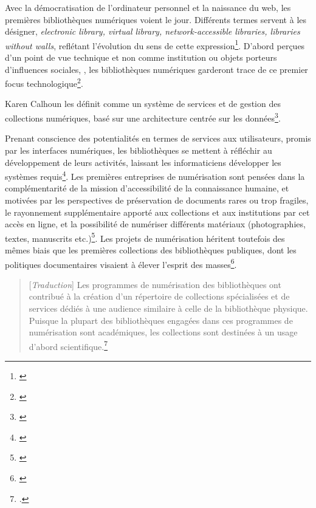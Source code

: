 Avec la démocratisation de l'ordinateur personnel et la naissance du web, les premières bibliothèques numériques voient le jour. Différents termes servent à les désigner, \textit{electronic library, virtual library, network-accessible libraries, libraries without walls}, reflétant l'évolution du sens de cette expression\footnote{\cite[p.3]{xie_discover_2016}}. D'abord perçues d'un point de vue technique et non comme institution ou objets porteurs d'influences sociales, , les bibliothèques numériques garderont trace de ce premier focus technologique\footnote{\cite[p.245]{jones_public_2017}}. 

Karen Calhoun les définit comme un système  de services et de gestion des collections numériques, basé sur une architecture centrée sur les données\footnote{\cite{calhoun_exploring_2014}}.

Prenant conscience des potentialités en termes de services aux utilisateurs, promis par les interfaces numériques, les bibliothèques se mettent à réfléchir au développement de leurs activités, laissant les informaticiens développer les systèmes requis\footnote{\cite{jones_public_2017}}. Les premières entreprises de numérisation sont pensées dans la complémentarité de la mission d'accessibilité de la connaissance humaine, et motivées par les perspectives de préservation de documents rares ou trop fragiles, le rayonnement supplémentaire apporté aux collections et aux institutions par cet accès en ligne, et la possibilité de numériser différents matériaux (photographies, textes, manuscrits etc.)\footnote{\cite[p.274]{lopatin_library_2006}}. Les projets de numérisation héritent toutefois des mêmes biais que les premières collections des bibliothèques publiques, dont les politiques documentaires visaient à élever l'esprit des masses\footnote{\cite{jones_public_2017}}. 

\begin{quotation}
[\textit{Traduction}]
Les programmes de numérisation des bibliothèques ont contribué à la création d'un répertoire de collections spécialisées et de services dédiés à une audience similaire à celle de la bibliothèque physique. Puisque la plupart des bibliothèques engagées dans ces programmes de numérisation sont académiques, les collections sont destinées à un usage d'abord scientifique.\footnote{\cite[p.247]{jones_public_2017}.}
\end{quotation}

